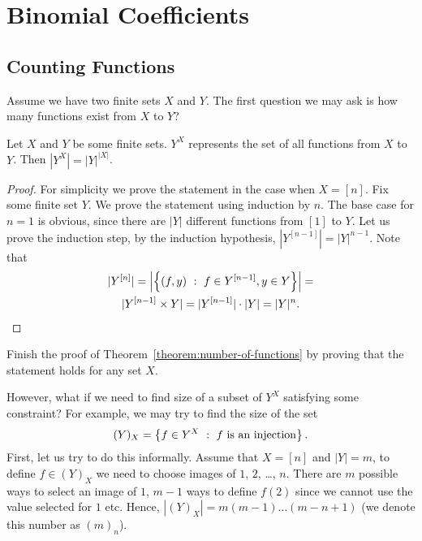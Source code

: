 \chapter{Binomial Coefficients}
\section{Counting Functions}
Assume we have two finite sets $X$ and $Y$. The first question we may ask is
how many functions exist from $X$ to $Y$?


\begin{theorem}
\label{theorem:number-of-functions}
  Let $X$ and $Y$ be some finite sets. $Y^X$ represents the set of all
  functions from $X$ to $Y$. Then $|Y^X| = |Y|^{|X|}$.
\end{theorem}
\begin{proof}
  For simplicity we prove the statement in the case when $X = [n]$. Fix some
  finite set $Y$. We prove the statement using induction by $n$. The base case
  for $n = 1$ is obvious, since there are $|Y|$ different functions from $[1]$
  to $Y$. Let us prove the induction step, by the induction hypothesis,
  $|Y^{[n - 1]}| = |Y|^{n - 1}$. Note that
  \begin{multline*}
    |Y^{[n]}| = \left| \set[f \in Y^{[ n - 1]}, y \in Y]{(f, y)} \right| = \\
    |Y^{[n - 1]} \times Y| = |Y^{[n - 1]}| \cdot |Y| = |Y|^n.
  \end{multline*}
\end{proof}

\begin{exercise}
  Finish the proof of Theorem~\ref{theorem:number-of-functions} by proving that
  the statement holds for any set $X$.
\end{exercise}

However, what if we need to find size of a subset of $Y^X$ satisfying some
constraint? For example, we may try to find the size of the set
\[
  (Y)_X = \set[f\text{ is an injection}]{f \in Y^X}.
\]
First, let us try to do this informally. Assume that $X = [n]$ and $|Y| = m$,
to define $f \in (Y)_X$ we need to choose images of $1$, $2$, \dots, $n$. There
are $m$ possible ways to select an image of $1$, $m - 1$ ways to define $f(2)$
since we cannot use the value selected for $1$ etc. Hence,
$|(Y)_X| = m (m - 1) \dots (m - n + 1)$ (we denote this number as $(m)_n$).

